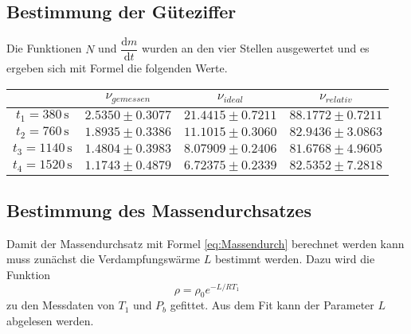 \subsection{Bestimmung der Güteziffer}

Die Funktionen $N$ und $\dfrac{\text{d}m}{\text{d}t}$ wurden an den vier Stellen ausgewertet und es ergeben sich mit Formel \label{eq:effrealdiffquo} die folgenden Werte.



\begin{table}[H]
  \centering
  \label{tab:gueteziffer}
  \begin{tabular}{S S S S[table-format=2.4]}
    \toprule
    & {$ν_{gemessen}$} &  {$ν_{ideal}$} & {$ν_{relativ}$} \\
    \midrule
    {$t_1 = 380  \, \unit{\second}$} & {$2.5350 \pm 0.3077$} & {$21.4415 \pm 0.7211$} &  {$88.1772 \pm 0.7211$} \\
    {$t_2 = 760  \, \unit{\second}$} & {$1.8935 \pm 0.3386$} & {$11.1015 \pm 0.3060$} &   {$82.9436 \pm 3.0863$}\\            
    {$t_3 = 1140 \, \unit{\second}$} & {$1.4804 \pm 0.3983$} & {$8.07909 \pm 0.2406$} &  {$81.6768 \pm 4.9605$}\\
    {$t_4 = 1520 \, \unit{\second}$} & {$1.1743 \pm 0.4879$} & {$6.72375 \pm 0.2339$} &  {$82.5352\pm 7.2818$}\\
    \bottomrule
  \end{tabular}
\end{table}

\subsection{Bestimmung des Massendurchsatzes}

Damit der Massendurchsatz mit Formel \eqref{eq:Massendurch} berechnet werden kann muss zunächst die Verdampfungswärme $L$ bestimmt werden.
Dazu wird die Funktion 
\begin{equation}
  \rho = \rho_0 e^{-L/R T_1}
\end{equation}
zu den Messdaten von $T_1$ und $P_b$ gefittet. Aus dem Fit kann der Parameter $L$ abgelesen werden.\\


